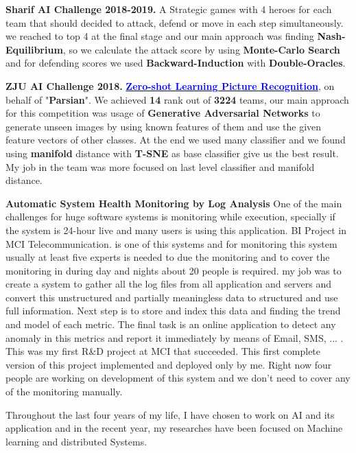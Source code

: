 \documentclass[11pt, a4paper]{awesome-cv}
\begin{document}
\begin{cvletter}
\textbf{Sharif AI Challenge 2018-2019.} \newline
A Strategic games with 4 heroes for each team that should decided to attack, defend or move in each step simultaneously. we reached to top 4 at the final stage and our main approach was finding \textbf{Nash-Equilibrium}, so we calculate the attack score by using \textbf{Monte-Carlo Search} and for defending scores we used \textbf{Backward-Induction} with \textbf{Double-Oracles}.

\textbf{ZJU AI Challenge 2018.}
\href{https://tianchi.aliyun.com/competition/rankingList.htm?spm=5176.100067.5678.4.3c934bddlu2Aga&raceId=231677}{\textcolor{blue}{\textbf{Zero-shot Learning Picture Recognition}}}, \newline
on behalf of "\textbf{Parsian}". We achieved \textbf{14} rank out of \textbf{3224} teams, our main approach for this competition was usage of \textbf{Generative Adversarial Networks} to generate unseen images by using known features of them and use the given feature vectors of other classes.
At the end we used many classifier and we found using \textbf{manifold} distance with \textbf{T-SNE} as base classifier give us the best result.
My job in the team was more focused on last level classifier and manifold distance.

\textbf{Automatic System Health Monitoring by Log Analysis} \newline
One of the main challenges for huge software systems is monitoring while execution, specially if the system is 24-hour live and many users is using this application.
BI Project in MCI Telecommunication. is one of this systems and for monitoring this system usually at least five experts is needed to due the monitoring and to cover the monitoring in during day and nights about 20 people is required. my job was to create a system to gather all the log files from all application and servers and convert this unstructured and partially meaningless data to structured and use full information. Next step is to store and index this data and finding the trend and model of each metric.
The final task is an online application to detect any anomaly in this metrics and report it immediately by means of Email, SMS, ... .
This was my first R\&D project at MCI that succeeded. This first complete version of this project implemented and deployed only by me. Right now four people are working on development of this system and we don't need to cover any of the monitoring manually.

Throughout the last four years of my life, I have chosen to work on AI and its application and in the recent year, my researches have been focused on Machine learning and distributed Systems. 


\end{cvletter}
\end{document}
